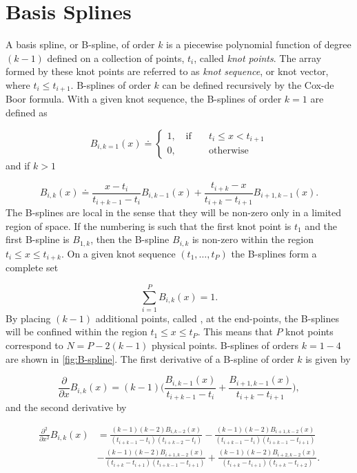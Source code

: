 \chapter{Basis Splines}\label{B-splines}
A basis spline, or B-spline, of order $k$ is a piecewise polynomial function of degree $(k-1)$ defined on a collection of points, $t_i$, called \textit{knot points}. The array formed by these knot points are referred to as \textit{knot sequence}, or knot vector, where $t_i\leq t_{i+1}$. B-splines of order $k$ can be defined recursively by the Cox-de Boor formula. With a given knot sequence, the B-splines of order $k=1$ are defined as

\begin{equation}
B_{i,k=1}(x) \doteq
\begin{cases}
1, \quad \text{if} \quad & t_i \leq x < t_{i+1}\\
0,& \text{otherwise} 
\end{cases}
\end{equation}
and if $k>1$

\begin{equation}
B_{i,k}(x) \doteq \frac{x-t_i}{t_{i+k-1}-t_i}B_{i,k-1}(x) + \frac{t_{i+k}-x}{t_{i+k}-t_{i+1}}B_{i+1,k-1}(x).
\end{equation}
The B-splines are local in the sense that they will be non-zero only in a limited region of space. If the numbering is such that the first knot point is $t_1$ and the first  B-spline is $B_{1,k}$, then the B-spline $B_{i,k}$ is non-zero within the region $t_i \leq x \leq t_{i+k}$. On a given knot sequence $(t_1,\ldots , t_P)$ the B-splines form a complete set

\begin{equation}
\sum_{i=1}^{P} B_{i,k}(x) = 1.
\end{equation}
By placing $(k-1)$ additional points, called , at the end-points, the B-splines will be confined within the region $t_1 \leq x \leq t_P$. This means that $P$ knot points correspond to $N=P-2(k-1)$ physical points. B-splines of orders $k=1-4$ are shown in \cref{fig:B-spline}. The first derivative of a B-spline of order $k$ is given by

\begin{equation}
\frac{\partial}{\partial x}B_{i,k}(x) = (k-1)\bigg(\frac{B_{i,k-1}(x)}{t_{i+k-1}-t_i} + \frac{B_{i+1,k-1}(x)}{t_{i+k}-t_{i+1}}\bigg),
\end{equation}
and the second derivative by

\begin{align}
\frac{\partial^2}{\partial x^2}B_{i,k}(x) &= \frac{(k-1)(k-2)B_{i,k-2}(x)}{(t_{i+k-1}-t_i)(t_{i+k-2}-t_i)} - \frac{(k-1)(k-2)B_{i+1,k-2}(x)}{(t_{i+k-1}-t_i)(t_{i+k-1}-t_{i+1})}\nonumber\\
&- \frac{(k-1)(k-2)B_{i+1,k-2}(x)}{(t_{i+k}-t_{i+1})(t_{i+k-1}-t_{i+1})} +  \frac{(k-1)(k-2)B_{i+2,k-2}(x)}{(t_{i+k}-t_{i+1})(t_{i+k}-t_{i+2})}.
\end{align}

